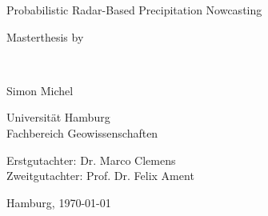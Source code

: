 \documentclass[11pt,twoside,a4paper,fleqn,x11names]{report}
\numberwithin{equation}{chapter}
\numberwithin{figure}{chapter}
\numberwithin{table}{chapter}
\begin{document}
	\thispagestyle{empty}
	\begin{center}
		\hspace*{0pt}\vfill
		\begin{Huge}
			Probabilistic Radar-Based Precipitation Nowcasting
		\end{Huge}
		\vfill
		\begin{minipage}{0.5\textwidth}
			\centering
				\begin{large}
					Masterthesis by
				\end{large}
				\\\vspace{0.5cm}
				\begin{huge}
					Simon Michel
				\end{huge}
		\end{minipage}
		\vfill
		
		\begin{minipage}{0.5\textwidth}
			\centering
				\begin{large}
					Universität Hamburg\\
					Fachbereich Geowissenschaften
				\end{large}
		\end{minipage}
		\vfill
		
		\begin{minipage}{0.5\textwidth}
			\centering
				\begin{large}
					Erstgutachter: Dr. Marco Clemens\\
					Zweitgutachter: Prof. Dr. Felix Ament
				\end{large}
		\end{minipage}
		\vfill
		\begin{minipage}{0.5\textwidth}
			\centering
				\begin{large}
					Hamburg, \today
				\end{large}
		\end{minipage}
		\vfill
	\end{center}
	
\end{document}
